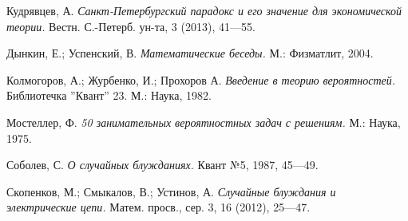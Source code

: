 \documentclass{article}
\begin{document}
\begin{thebibliography}{52}

Кудрявцев, А.
\emph{Санкт-Петербургский парадокс и его значение для экономической теории.} 
Вестн. С.-Петерб. ун-та, 3 (2013), 41---55.

 Дынкин, Е.; Успенский, В.
\emph{Математические беседы.}
М.: Физматлит, 2004.


Колмогоров, А.; Журбенко, И.; Прохоров А.
\emph{Введение в теорию вероятностей.}
Библиотечка ''Квант'' 23.
М.: Наука, 1982.

Мостеллер, Ф.
\emph{50 занимательных вероятностных задач с решениям.}
М.: Наука, 1975. 

Соболев, С.
\emph{О случайных блужданиях.} 
Квант №5, 1987, 45---49.

Скопенков, М.; Смыкалов, В.;  Устинов, А.
\emph{Случайные блуждания и электрические цепи.}
Матем. просв., сер. 3, 16 (2012),  25---47.






\end{thebibliography}
\end{document}
